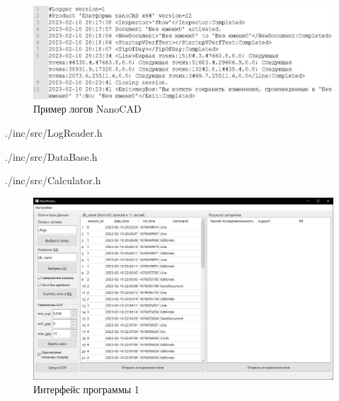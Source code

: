 
\begin{figure}[h!] %
	\centering
	\includegraphics[width=1\textwidth]{inc/img/logs2.jpg}
	\caption{Пример логов NanoCAD}
	\label{NanoCAD_logs}
\end{figure}


\begin{lstinputlisting}[
	caption={Класс LogReader},
	label={LogReader.h},
	language=C++,
	]{./inc/src/LogReader.h}
\end{lstinputlisting}

\newpage
\begin{lstinputlisting}[
	caption={Класс DataBase},
	label={DataBase.h},
	language=C++,
	]{./inc/src/DataBase.h}
\end{lstinputlisting}

\newpage
\begin{lstinputlisting}[
	caption={Класс Calculator},
	label={Calculator.h},
	language=C++,
	]{./inc/src/Calculator.h}
\end{lstinputlisting}


\begin{figure}[h!]
	\centering
	\includegraphics[width=1\textwidth]{inc/img/interface1.jpg}
	\caption{Интерфейс программы 1}
	\label{interface1}
\end{figure}

